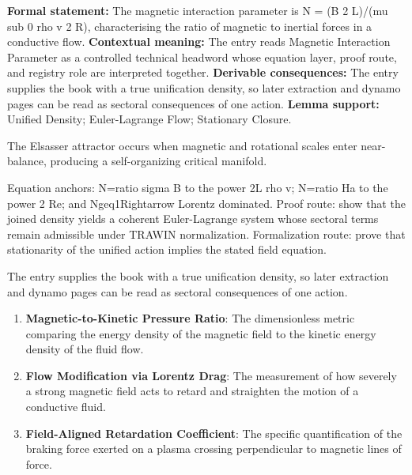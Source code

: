 \begingroup\footnotesize\setlength{\emergencystretch}{3em}\sloppy
\textbf{Formal statement:} The magnetic interaction parameter is N = (B 2 L)/(mu sub 0 rho v 2 R), characterising the ratio of magnetic to inertial forces in a conductive flow. \textbf{Contextual meaning:} The entry reads Magnetic Interaction Parameter as a controlled technical headword whose equation layer, proof route, and registry role are interpreted together. \textbf{Derivable consequences:} The entry supplies the book with a true unification density, so later extraction and dynamo pages can be read as sectoral consequences of one action. \textbf{Lemma support:} Unified Density; Euler-Lagrange Flow; Stationary Closure.\par
\endgroup

The Elsasser attractor occurs when magnetic and rotational scales enter near-balance, producing a self-organizing critical manifold.

Equation anchors: N=ratio sigma B to the power 2L rho v; N=ratio Ha to the power 2 Re; and Ngeq1Rightarrow Lorentz dominated. Proof route: show that the joined density yields a coherent Euler-Lagrange system whose sectoral terms remain admissible under TRAWIN normalization. Formalization route: prove that stationarity of the unified action implies the stated field equation.

The entry supplies the book with a true unification density, so later extraction and dynamo pages can be read as sectoral consequences of one action.
\endgroup

\begin{enumerate}[leftmargin=1.6em,itemsep=6pt,topsep=4pt]
\item \textbf{Magnetic-to-Kinetic Pressure Ratio}: The dimensionless metric comparing the energy density of the magnetic field to the kinetic energy density of the fluid flow.
\item \textbf{Flow Modification via Lorentz Drag}: The measurement of how severely a strong magnetic field acts to retard and straighten the motion of a conductive fluid.
\item \textbf{Field-Aligned Retardation Coefficient}: The specific quantification of the braking force exerted on a plasma crossing perpendicular to magnetic lines of force.
\end{enumerate}

